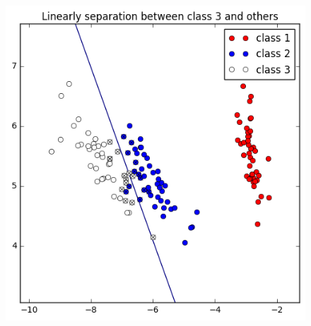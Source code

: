 \documentclass[a4paper,11pt]{article}
\begin{document}
\begin{figure}[htbp]
  \includegraphics[scale=0.3]{l3_12.png}
\end{figure}
\end{document}
